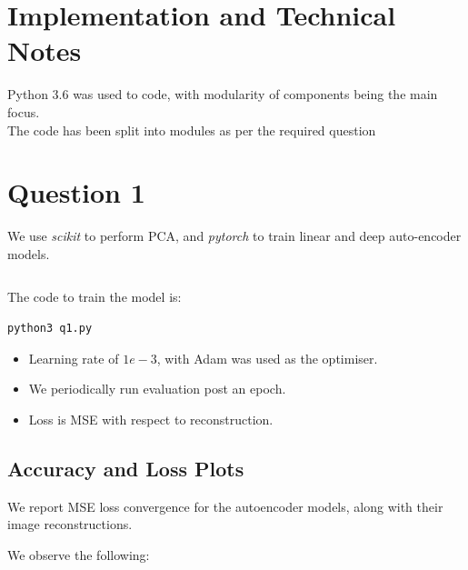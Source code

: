 \section {Implementation and Technical Notes}

Python 3.6 was used to code, with modularity of components being the main focus. \\

The code has been split into modules as per the required question


\section {Question 1}

We use \textit{scikit} to perform PCA, and \textit{pytorch } to train linear and deep auto-encoder models.

\begin{lstlisting}

\end{lstlisting}

The code to train the model is:

\begin{lstlisting}
python3 q1.py 
\end{lstlisting}

\begin{itemize}
\item Learning rate of $1e-3$, with Adam was used as the optimiser.
\item We periodically run evaluation post an epoch. 
\item Loss is MSE with respect to reconstruction.
\end{itemize}

\subsection{Accuracy and Loss Plots}

We report MSE loss convergence for the autoencoder models, along with their image reconstructions.

We observe the following:

